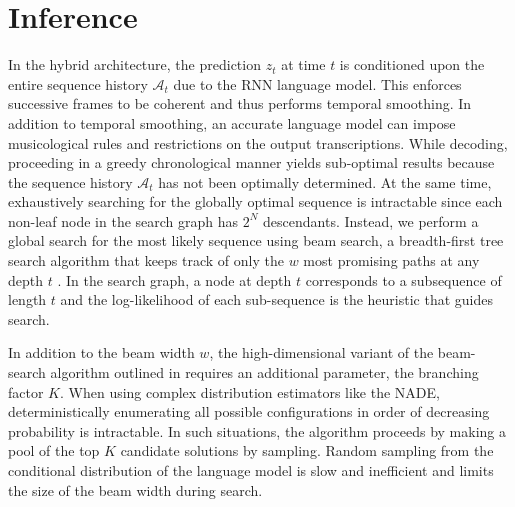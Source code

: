 \documentclass{article}
\begin{document}
\section{Inference}

In the hybrid architecture, the prediction $z_t$ at time $t$ is conditioned upon the entire sequence history $\mathcal A_t$ due to the RNN language model. This enforces successive frames to be coherent and thus performs temporal smoothing. In addition to temporal smoothing, an accurate language model can impose musicological rules and restrictions on the output transcriptions. While decoding, proceeding in a greedy chronological manner yields sub-optimal results because the sequence history $\mathcal A_t$ has not been optimally determined. At the same time, exhaustively searching for the globally optimal sequence is intractable since each non-leaf node in the search graph has $2^{N}$ descendants. Instead, we perform a global search for the most likely sequence using beam search, a breadth-first tree search algorithm that keeps track of only the $w$ most promising paths at any depth $t$ \cite{graves2012sequence,boulanger2013high,boulangerphone}. In the search graph, a node at depth $t$ corresponds to a subsequence of 
length $t$ and the log-likelihood of each sub-sequence is the heuristic that guides search. 

In addition to the beam width $w$, the high-dimensional variant of the beam-search algorithm outlined in \cite{boulanger2013high} requires an additional parameter, the branching factor $K$. When using complex distribution estimators like the NADE, deterministically enumerating all possible configurations in order of decreasing probability is intractable. In such situations, the algorithm proceeds by making a pool of the top $K$ candidate solutions by sampling. Random sampling from the conditional distribution of the language model is slow and inefficient and limits the size of the beam width during search. 

\end{document}
